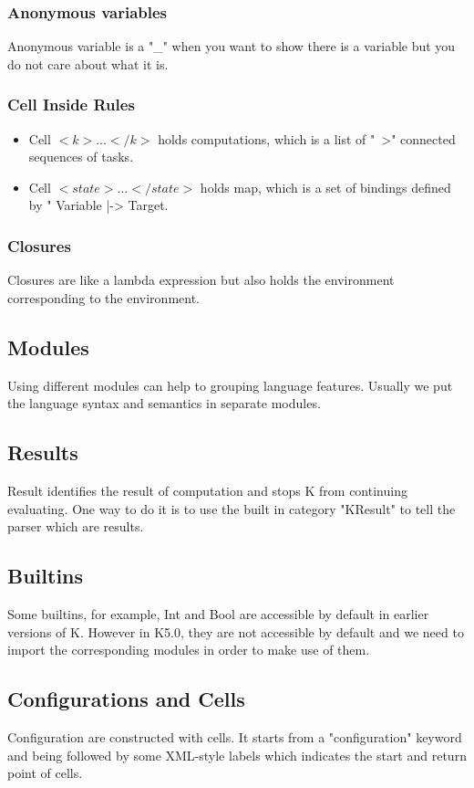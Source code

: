 \documentclass[a4paper]{article}
\begin{document}
\subsubsection{Anonymous variables}
Anonymous variable is a "\_" when you want to show there is a variable but you do not care about what it is.
\subsubsection{Cell Inside Rules}
\begin{itemize}
    \item Cell $<k>...</k>$ holds computations, which is a list of "~>" connected sequences of tasks.
    \item Cell $<state>...</state>$ holds map, which is a set of bindings defined by " Variable |-> Target.
\end{itemize}
\subsubsection{Closures}
Closures are like a lambda expression but also holds the environment corresponding to the environment.

\subsection{Modules}
Using different modules can help to grouping language features. Usually we put the language syntax and semantics in separate modules. 

\subsection{Results}
Result identifies the result of computation and stops K from continuing evaluating. One way to do it is to use the built in category "KResult" to tell the parser which are results. 

\subsection{Builtins}
Some builtins, for example, Int and Bool are accessible by default in earlier versions of K. However in K5.0, they are not accessible by default and we need to import the corresponding modules in order to make use of them.

\subsection{Configurations and Cells}
Configuration are constructed with cells. It starts from a "configuration" keyword and being followed by some XML-style labels which indicates the start and return point of cells.
\end{document}
